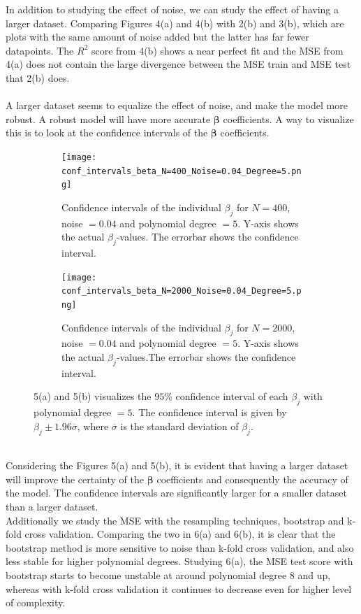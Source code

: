 \documentclass[a4paper,twocolumn]{article}
\newcommand{\B}{\boldsymbol{\beta}}
\begin{document}
In addition to studying the effect of noise, we can study the effect of having a larger dataset. Comparing Figures 4(a) and 4(b) with 2(b) and 3(b), which are plots with the same amount of noise added but the latter has far fewer datapoints. The $R^{2}$ score from 4(b) shows a near perfect fit and the MSE from 4(a) does not contain the large divergence between the MSE train and MSE test that 2(b) does.\\
\\
A larger dataset seems to equalize the effect of noise, and make the model more robust. A robust model will have more accurate $\B$ coefficients. A way to visualize this is to look at the confidence intervals of the $\B$ coefficients.
\begin{figure}[ht]
    \centering
    \begin{subfigure}[b]{0.9\columnwidth}
        \texttt{[image: conf\_intervals\_beta\_N=400\_Noise=0.04\_Degree=5.png]}
        \caption{Confidence intervals of the individual $\beta_{j}$ for $N = 400$, noise $= 0.04$ and polynomial degree $= 5$. Y-axis shows the actual $\beta_{j}$-values. The errorbar shows the confidence interval.}
    \end{subfigure}
    
    \begin{subfigure}[b]{0.9\columnwidth}
        \texttt{[image: conf\_intervals\_beta\_N=2000\_Noise=0.04\_Degree=5.png]}
        \caption{Confidence intervals of the individual $\beta_{j}$ for $N = 2000$, noise $= 0.04$ and polynomial degree $= 5$. Y-axis shows the actual $\beta_{j}$-values.The errorbar shows the confidence interval.}
    \end{subfigure}
    \caption{5(a) and 5(b) visualizes the $95\%$ confidence interval of each $\beta_{j}$ with polynomial degree $= 5$. The confidence interval is given by $\beta_{j} \pm 1.96\overline{\sigma}$, where $\overline{\sigma}$ is the standard deviation of $\beta_{j}$.}
\end{figure}\\
Considering the Figures 5(a) and 5(b), it is evident that having a larger dataset will improve the certainty of the $\B$ coefficients and consequently the accuracy of the model. The confidence intervals are significantly larger for a smaller dataset than a larger dataset.\\
Additionally we study the MSE with the resampling techniques, bootstrap and k-fold cross validation. Comparing the two in 6(a) and 6(b), it is clear that the bootstrap method is more sensitive to noise than k-fold cross validation, and also less stable for higher polynomial degrees. Studying 6(a), the MSE test score with bootstrap starts to become unstable at around polynomial degree 8 and up, whereas with k-fold cross validation it continues to decrease even for higher level of complexity.
\end{document}
